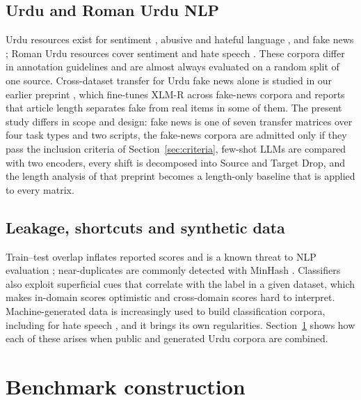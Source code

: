 \documentclass[acmsmall,screen]{acmart}
\begin{document}
\subsection{Urdu and Roman Urdu NLP}
Urdu resources exist for sentiment \citep{khan2020usc,khan2022multiclass}, abusive and hateful language \citep{akram2023isehate}, and fake news \citep{amjad2020bend,harris2023axtogrind}; Roman Urdu resources cover sentiment \citep{mehmood2019rusad,tehreem2021youtube} and hate speech \citep{rizwan2020hate}. These corpora differ in annotation guidelines and are almost always evaluated on a random split of one source. Cross-dataset transfer for Urdu fake news alone is studied in our earlier preprint \citep{haroon2026crossdataset}, which fine-tunes XLM-R across fake-news corpora and reports that article length separates fake from real items in some of them. The present study differs in scope and design: fake news is one of seven transfer matrices over four task types and two scripts, the fake-news corpora are admitted only if they pass the inclusion criteria of Section~\ref{sec:criteria}, few-shot LLMs are compared with two encoders, every shift is decomposed into Source and Target Drop, and the length analysis of that preprint becomes a length-only baseline that is applied to every matrix.

\subsection{Leakage, shortcuts and synthetic data}
Train--test overlap inflates reported scores and is a known threat to NLP evaluation \citep{elangovan2021memorization,lee2022dedup,bowman2021fix}; near-duplicates are commonly detected with MinHash \citep{broder1997resemblance}. Classifiers also exploit superficial cues that correlate with the label in a given dataset, which makes in-domain scores optimistic and cross-domain scores hard to interpret. Machine-generated data is increasingly used to build classification corpora, including for hate speech \citep{hartvigsen2022toxigen}, and it brings its own regularities. Section~\ref{sec:construction} shows how each of these arises when public and generated Urdu corpora are combined.

\section{Benchmark construction}\label{sec:construction}
\end{document}
